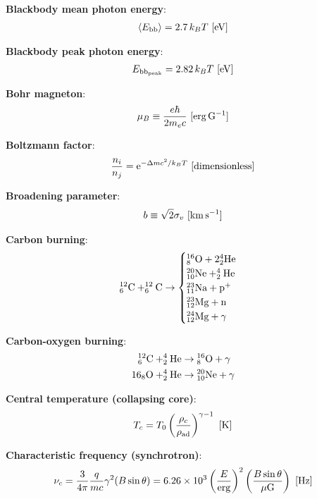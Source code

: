 \documentclass[a4paper,10pt]{article}
\begin{document}
{\noindent}\textbf{Blackbody mean photon energy}:
\begin{align*}
    \langle E_\mathrm{bb} \rangle = 2.7\,k_BT  ~ [{\rm eV}]
\end{align*}

{\noindent}\textbf{Blackbody peak photon energy}:
\begin{align*}
    E_\mathrm{bb_{peak}} = 2.82\,k_BT ~ [{\rm eV}]
\end{align*}

{\noindent}\textbf{Bohr magneton}:
\begin{align*}
    \mu_B \equiv \frac{e\hbar}{2m_ec} ~ [{\rm erg\,G^{-1}}]
\end{align*}

{\noindent}\textbf{Boltzmann factor}:
\begin{align*}
    \frac{n_i}{n_j} = \mathrm{e}^{-\Delta mc^2/k_BT} ~ [{\rm dimensionless}]
\end{align*}

{\noindent}\textbf{Broadening parameter}:
\begin{align*}
    b \equiv \sqrt{2}\sigma_v ~ [{\rm km\,s^{-1}}]
\end{align*}

{\noindent}\textbf{Carbon burning}:
\begin{equation*}
^{12}_6{\rm C} + ^{12}_6{\rm C} \rightarrow 
\begin{cases}
    {\rm ^{16}_8O + 2^4_2He} \\
    {\rm ^{20}_{10}Ne + ^4_2He} \\
    {\rm ^{23}_{11}Na + p^+} \\
    {\rm ^{23}_{12}Mg + n} \\
    {\rm ^{24}_{12}Mg + \gamma}
\end{cases}
\end{equation*}

{\noindent}\textbf{Carbon-oxygen burning}:
\begin{align*}
    {\rm ^{12}_6C + ^4_2He} &\rightarrow {\rm ^{16}_8O + \gamma} \\
    {\rm {16}_8O + ^4_2He} &\rightarrow {\rm ^{20}_{10}Ne + \gamma}
\end{align*}

{\noindent}\textbf{Central temperature (collapsing core)}:
\begin{align*}
    T_c = T_0 \left(\frac{\rho_c}{\rho_{\rm ad}}\right) ^{\gamma-1} ~ [{\rm K}]
\end{align*}

{\noindent}\textbf{Characteristic frequency (synchrotron)}:
\begin{align*}
    \nu_c = \frac{3}{4\pi}\frac{q}{mc}\gamma^2(B\sin\theta) = 6.26\times10^3 \left(\frac{E}{{\rm erg}}\right)^2 \left(\frac{B\sin\theta}{\mu{\rm G}}\right) ~ [{\rm Hz}]
\end{align*}
\end{document}
